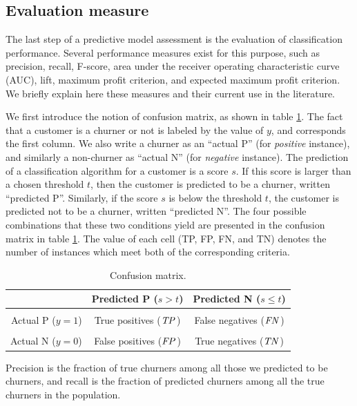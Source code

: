 \subsection{Evaluation measure}

The last step of a predictive model assessment is the evaluation of
classification performance. Several performance measures exist for this purpose,
such as precision, recall, F-score, area under the receiver operating
characteristic curve (AUC), lift, maximum profit criterion, and expected maximum
profit criterion. We briefly explain here these measures and their current use
in the literature.

We first introduce the notion of confusion matrix, as shown in table
\ref{tab:confusion_mat}. The fact that a customer is a churner or not is labeled
by the value of $y$, and corresponds the first column. We also write a churner
as an ``actual P'' (for \emph{positive} instance), and similarly a non-churner
as ``actual N'' (for \emph{negative} instance). The prediction of a
classification algorithm for a customer is a score $s$. If this score is larger
than a chosen threshold $t$, then the customer is predicted to be a churner,
written ``predicted P''. Similarly, if the score $s$ is below the threshold $t$,
the customer is predicted not to be a churner, written ``predicted N''. The
four possible combinations that these two conditions yield are presented
in the confusion matrix in table \ref{tab:confusion_mat}. The value of each
cell (TP, FP, FN, and TN) denotes the number of instances which meet both of the
corresponding criteria.

\begin{table}
    \centering
    \begin{tabular}{r|cc}
        & Predicted P ($s>t$) & Predicted N ($s\le t$) \\[15pt]
        \hline
        & & \\
        Actual P ($y=1$) & True positives ($\textit{TP}\,$) & False negatives ($\textit{FN}\,$) \\[15pt]

        & & \\
        Actual N ($y=0$) & False positives ($\textit{FP}\,$) & True negatives ($\textit{TN}\,$) \\[15pt]
    \end{tabular}
    \caption{Confusion matrix.}
    \label{tab:confusion_mat}
\end{table}

Precision is the fraction of true churners among all those we predicted to be
churners, and recall is the fraction of predicted churners among all the true
churners in the population.

